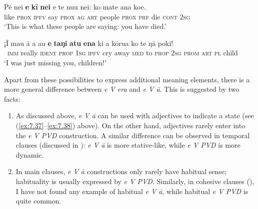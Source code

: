 \ea\label{ex:7.40}
\gll Pē nei \textbf{e} \textbf{kī} \textbf{nei} e te nu{\ꞌ}u nei: ko mate {\ꞌ}ana koe. \\
like \textsc{prox} \textsc{ipfv} say \textsc{prox} \textsc{ag} \textsc{art} people \textsc{prox} \textsc{prf} die \textsc{cont} \textsc{2sg} \\

\glt 
‘This is what these people are saying: you have died.’ \textstyleExampleref{[R229.316]} 
\z

\ea\label{ex:7.41}
\gll ¡{\ꞌ}Ī mau {\ꞌ}ā a au \textbf{e} \textbf{taŋi} \textbf{atu} \textbf{ena} ki a kōrua ko te ŋā poki! \\
~\textsc{imm} really \textsc{ident} \textsc{prop} \textsc{1sg} \textsc{ipfv} cry away \textsc{med} to \textsc{prop} \textsc{2sg} \textsc{prom} \textsc{art} \textsc{pl} child \\

\glt 
‘I was just missing you, children!’ \textstyleExampleref{[R313.097]} 
\z

Apart from these possibilities to express additional meaning elements, there is a more general difference between \textit{e V era} and \textit{e V {\ꞌ}ā}. This is suggested by two facts:

\begin{enumerate}
\item 
As discussed above, \textit{e V {\ꞌ}ā} can be used with adjectives to indicate a state (see (\ref{ex:7.37}–\ref{ex:7.38}) above). On the other hand, adjectives rarely enter into the \textit{e V PVD} construction. A similar difference can be observed in temporal clauses (discussed in ): \textit{e V {\ꞌ}ā} is more stative-like, while \textit{e V PVD} is more dynamic.

\item 
In main clauses, \textit{e V {\ꞌ}ā} constructions only rarely have habitual sense; habituality is usually expressed by \textit{e V PVD}. Similarly, in cohesive clauses (), I have not found any example of habitual \textit{e V {\ꞌ}ā}, while habitual \textit{e V PVD} is quite common. 

\end{enumerate}

